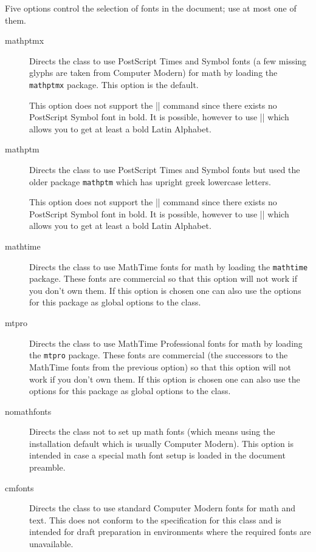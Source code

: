 Five options control the selection of fonts in the document; use at
most one of them.
\begin{description}
\item[mathptmx] Directs the class to use PostScript Times and Symbol
  fonts (a few missing glyphs are taken from Computer Modern) for
  math by loading the \texttt{mathptmx} package.
  This option is the default.

  This option does not support the |\boldmath| command since there
  exists no PostScript Symbol font in bold. It is possible, however to
  use |\mathbf| which allows you to get at least a bold Latin
  Alphabet.

\item[mathptm] Directs the class to use PostScript Times and Symbol
  fonts but used the older package \texttt{mathptm} which has upright
  greek lowercase letters.

  This option does not support the |\boldmath| command since there
  exists no PostScript Symbol font in bold. It is possible, however to
  use |\mathbf| which allows you to get at least a bold Latin
  Alphabet.

\item[mathtime] Directs the class to use MathTime fonts for math by
  loading the \texttt{mathtime} package. These fonts are commercial so
  that this option will not work if you don't own them.
  If this option is chosen one can also use the options for this
  package as global options to the class.

\item[mtpro] Directs the class to use MathTime Professional fonts for math by
  loading the \texttt{mtpro} package. These fonts are commercial (the
  successors to the MathTime fonts from the previous option) so
  that this option will not work if you don't own them.
  If this option is chosen one can also use the options for this
  package as global options to the class.

\item[nomathfonts] Directs the class not to set up math fonts (which
  means using the installation default which is usually Computer
  Modern). This option is intended in case a special math font setup
  is loaded in the document preamble.

\item[cmfonts] Directs the class to use standard Computer Modern fonts
  for math and text. This does not conform to the specification for this
  class and is intended for draft preparation in environments where
  the required fonts are unavailable.
\end{description}

